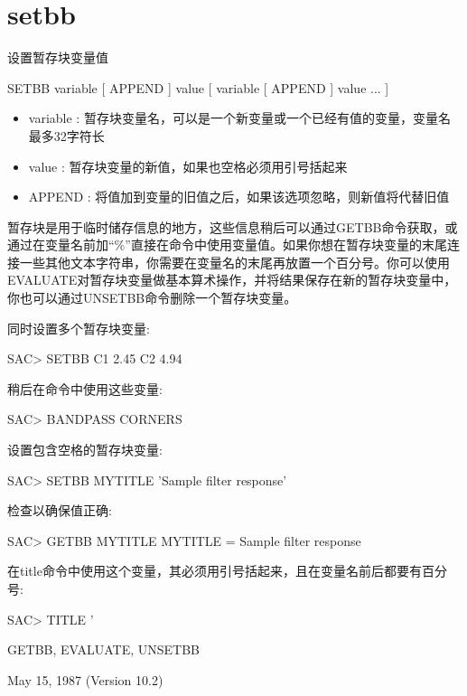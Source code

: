 \section{setbb}
\label{cmd:setbb}

设置暂存块变量值

SETBB variable  [ APPEND ] value [ variable [ APPEND ] value ... ]

\begin{itemize}
\item variable : 暂存块变量名，可以是一个新变量或一个已经有值的变量，变量名最多32字符长
\item value : 暂存块变量的新值，如果也空格必须用引号括起来 
\item APPEND : 将值加到变量的旧值之后，如果该选项忽略，则新值将代替旧值 
\end{itemize}

暂存块是用于临时储存信息的地方，这些信息稍后可以通过GETBB命令获取，或通过在变量名前加``\%''直接在命令中使用变量值。如果你想在暂存块变量的末尾连接一些其他文本字符串，你需要在变量名的末尾再放置一个百分号。你可以使用EVALUATE对暂存块变量做基本算术操作，并将结果保存在新的暂存块变量中，你也可以通过UNSETBB命令删除一个暂存块变量。

同时设置多个暂存块变量:
\begin{SACCode}
SAC>  SETBB C1 2.45 C2 4.94
\end{SACCode}

稍后在命令中使用这些变量:
\begin{SACCode}
SAC>  BANDPASS CORNERS %
\end{SACCode}

设置包含空格的暂存块变量:
\begin{SACCode}
SAC>  SETBB MYTITLE 'Sample filter response'
\end{SACCode}
检查以确保值正确:
\begin{SACCode}
SAC>  GETBB MYTITLE
 MYTITLE = Sample filter response
\end{SACCode}

在title命令中使用这个变量，其必须用引号括起来，且在变量名前后都要有百分号:
\begin{SACCode}
SAC>  TITLE '%
\end{SACCode}

GETBB, EVALUATE, UNSETBB

May 15, 1987 (Version 10.2)
